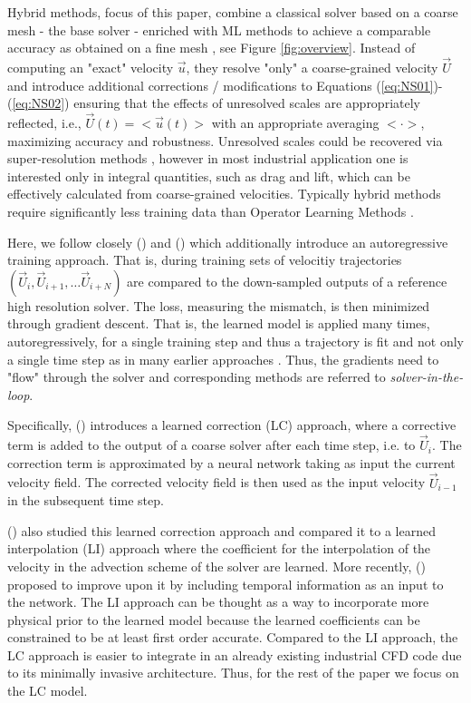 Hybrid methods, focus of this paper, combine a classical solver based on a coarse mesh - the base solver - enriched with ML methods to achieve a comparable accuracy as obtained on a fine mesh \cite{sanderse2024scientific}, see Figure \ref{fig:overview}. Instead of computing an "exact" velocity $\vec{u}$, they resolve "only" a coarse-grained velocity $\vec{U}$ and introduce additional corrections / modifications to Equations (\ref{eq:NS01})-(\ref{eq:NS02}) ensuring that the effects of unresolved scales are appropriately reflected, i.e., $\vec{U}(t) = <\vec{u}(t)>$ with an appropriate averaging $<\cdot>$, maximizing accuracy and robustness. Unresolved scales could be recovered via super-resolution methods \cite{shu2023physics}, however in most industrial application one is interested only in integral quantities, such as drag and lift, which can be effectively calculated from coarse-grained velocities. Typically hybrid methods require significantly less training data than Operator Learning Methods \cite{melchers2023comparison}.

Here, we follow closely \citeauthor{um2020solver} (\citeyear{um2020solver}) and \citeauthor{kochkov2021machine} (\citeyear{kochkov2021machine})
which additionally introduce an autoregressive training approach. That is, during training sets of velocitiy trajectories $(\vec{U}_{i}, \vec{U}_{i+1}, \ldots \vec{U}_{i+N})$ are compared to the down-sampled outputs of a reference high resolution solver. The loss, measuring the mismatch, is then minimized through gradient descent. That is, the learned model is applied many times, autoregressively, for a single training step and thus a trajectory is fit and not only a single time step as in many earlier approaches \cite{melchers2023comparison}. Thus, the gradients need to "flow" through the solver \cite{list2024temporal} and corresponding methods are referred to \textit{solver-in-the-loop}.

Specifically, \citeauthor{um2020solver} (\citeyear{um2020solver}) introduces a learned correction (LC) approach, where a corrective term is added to the output of a coarse solver after each time step, i.e. to $\vec{U}_i$. The correction term is approximated by a neural network taking as input the current velocity field. The corrected velocity field is then used as the input velocity $\vec{U}_{i-1}$ in the subsequent time step. 

\citeauthor{kochkov2021machine} (\citeyear{kochkov2021machine}) also studied this learned correction approach and compared it to a learned interpolation (LI) approach where the coefficient for the interpolation of the velocity in the advection scheme of the solver are learned. More recently, \citeauthor{sun2023neuralpdesolvertemporal} (\citeyear{sun2023neuralpdesolvertemporal}) proposed to improve upon it by including temporal information as an input to the network. The LI approach can be thought as a way to incorporate more physical prior to the learned model because the learned coefficients can be constrained to be at least first order accurate. Compared to the LI approach, the LC approach is easier to integrate in an already existing industrial CFD code due to its minimally invasive architecture. Thus, for the rest of the paper we focus on the LC model. 

